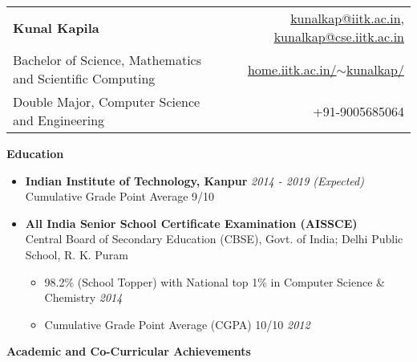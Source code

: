 \documentclass[letterpaper,11pt]{article}
\begin{document}
{\selectfont
\begin{tabular*}{7.5in}{l@{\extracolsep{\fill}}r}
    \textbf{\Large Kunal Kapila} & \href{mailto:kunalkap@iitk.ac.in}{kunalkap@iitk.ac.in},
        \href{mailto:kunalkap@cse.iitk.ac.in}{kunalkap@cse.iitk.ac.in}\\
    Bachelor of Science, Mathematics and Scientific Computing &
        \href{http://home.iitk.ac.in/~kunalkap/}{home.iitk.ac.in/$\sim$kunalkap/}\\
    Double Major, Computer Science and Engineering & +91-9005685064\\
    \hline
\end{tabular*}
\vspace{5pt}

\Large{\textbf{Education}}
\small
\vspace{-1pt}
\begin{itemize}
    \item
        \textbf{Indian Institute of Technology, Kanpur} \hfill \textit{2014 - 2019 (Expected)}\\
        Cumulative Grade Point Average 9/10\\
    \vspace{-3pt}
    \item
        \textbf{All India Senior School Certificate Examination (AISSCE)}\\
        Central Board of Secondary Education (CBSE), Govt. of India; Delhi Public School, R. K. Puram\\
        \vspace{-5pt}
        \begin{itemize}
            \item 98.2\% (School Topper) with National top 1\% in Computer Science \& Chemistry \hfill \textit{2014}\\
            \vspace{-2pt}
            \item Cumulative Grade Point Average (CGPA) 10/10 \hfill\textit{2012}\\
            \vspace{-2pt}
        \end{itemize}
\end{itemize}

\vspace{-1pt}
\Large{\textbf{Academic and Co-Curricular Achievements}}
\small
\vspace{-2pt}

}
\end{document}
